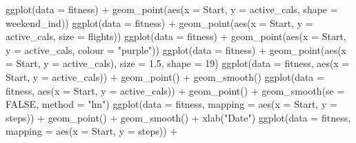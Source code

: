 \documentclass[
]{book}
\newenvironment{Shaded}{\begin{snugshade}}{\end{snugshade}}
\newcommand{\AttributeTok}[1]{\textcolor[rgb]{0.77,0.63,0.00}{#1}}
\newcommand{\ConstantTok}[1]{\textcolor[rgb]{0.00,0.00,0.00}{#1}}
\newcommand{\DecValTok}[1]{\textcolor[rgb]{0.00,0.00,0.81}{#1}}
\newcommand{\FloatTok}[1]{\textcolor[rgb]{0.00,0.00,0.81}{#1}}
\newcommand{\FunctionTok}[1]{\textcolor[rgb]{0.00,0.00,0.00}{#1}}
\newcommand{\NormalTok}[1]{#1}
\newcommand{\SpecialCharTok}[1]{\textcolor[rgb]{0.00,0.00,0.00}{#1}}
\newcommand{\StringTok}[1]{\textcolor[rgb]{0.31,0.60,0.02}{#1}}
\begin{document}
\begin{Shaded}
\begin{Highlighting}[]
\FunctionTok{ggplot}\NormalTok{(}\AttributeTok{data =}\NormalTok{ fitness) }\SpecialCharTok{+}
  \FunctionTok{geom\_point}\NormalTok{(}\FunctionTok{aes}\NormalTok{(}\AttributeTok{x =}\NormalTok{ Start, }\AttributeTok{y =}\NormalTok{ active\_cals, }\AttributeTok{shape =}\NormalTok{ weekend\_ind))}
\FunctionTok{ggplot}\NormalTok{(}\AttributeTok{data =}\NormalTok{ fitness) }\SpecialCharTok{+}
  \FunctionTok{geom\_point}\NormalTok{(}\FunctionTok{aes}\NormalTok{(}\AttributeTok{x =}\NormalTok{ Start, }\AttributeTok{y =}\NormalTok{ active\_cals, }\AttributeTok{size =}\NormalTok{ flights))}
\FunctionTok{ggplot}\NormalTok{(}\AttributeTok{data =}\NormalTok{ fitness) }\SpecialCharTok{+}
  \FunctionTok{geom\_point}\NormalTok{(}\FunctionTok{aes}\NormalTok{(}\AttributeTok{x =}\NormalTok{ Start, }\AttributeTok{y =}\NormalTok{ active\_cals, }\AttributeTok{colour =} \StringTok{"purple"}\NormalTok{))}
\FunctionTok{ggplot}\NormalTok{(}\AttributeTok{data =}\NormalTok{ fitness) }\SpecialCharTok{+}
  \FunctionTok{geom\_point}\NormalTok{(}\FunctionTok{aes}\NormalTok{(}\AttributeTok{x =}\NormalTok{ Start, }\AttributeTok{y =}\NormalTok{ active\_cals), }\AttributeTok{size =} \FloatTok{1.5}\NormalTok{, }\AttributeTok{shape =} \DecValTok{19}\NormalTok{)}
\FunctionTok{ggplot}\NormalTok{(}\AttributeTok{data =}\NormalTok{ fitness, }\FunctionTok{aes}\NormalTok{(}\AttributeTok{x =}\NormalTok{ Start, }\AttributeTok{y =}\NormalTok{ active\_cals)) }\SpecialCharTok{+}
  \FunctionTok{geom\_point}\NormalTok{() }\SpecialCharTok{+}
  \FunctionTok{geom\_smooth}\NormalTok{()}
\FunctionTok{ggplot}\NormalTok{(}\AttributeTok{data =}\NormalTok{ fitness, }\FunctionTok{aes}\NormalTok{(}\AttributeTok{x =}\NormalTok{ Start, }\AttributeTok{y =}\NormalTok{ active\_cals)) }\SpecialCharTok{+}
  \FunctionTok{geom\_point}\NormalTok{() }\SpecialCharTok{+}
  \FunctionTok{geom\_smooth}\NormalTok{(}\AttributeTok{se =} \ConstantTok{FALSE}\NormalTok{, }\AttributeTok{method =} \StringTok{"lm"}\NormalTok{)}
\FunctionTok{ggplot}\NormalTok{(}\AttributeTok{data =}\NormalTok{ fitness, }\AttributeTok{mapping =} \FunctionTok{aes}\NormalTok{(}\AttributeTok{x =}\NormalTok{ Start, }\AttributeTok{y =}\NormalTok{ steps)) }\SpecialCharTok{+}
  \FunctionTok{geom\_point}\NormalTok{() }\SpecialCharTok{+} \FunctionTok{geom\_smooth}\NormalTok{() }\SpecialCharTok{+} \FunctionTok{xlab}\NormalTok{(}\StringTok{"Date"}\NormalTok{)}
\FunctionTok{ggplot}\NormalTok{(}\AttributeTok{data =}\NormalTok{ fitness, }\AttributeTok{mapping =} \FunctionTok{aes}\NormalTok{(}\AttributeTok{x =}\NormalTok{ Start, }\AttributeTok{y =}\NormalTok{ steps)) }\SpecialCharTok{+}

\end{Highlighting}
\end{Shaded}
\end{document}
